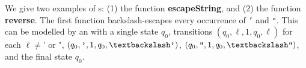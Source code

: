\begin{example}\label{exmp-ft}
    We give two examples of \FT{}s: %
    (1) the function \textbf{escapeString}, and (2) the  function \textbf{reverse}.
%
%
%
The first function backslash-escapes every occurrence of \texttt{'} and 
\texttt{"}. This can be modelled by an \FT{} with a single state $q_0$,
transitions 
$(q_0, \ell, 1, q_0, \ell)$ for each $\ell \neq  \texttt{'}$  or $\texttt{"} $, 
$(q_0,\texttt{'}, 1, q_0, \textbackslash\texttt{'})$, 
$(q_0,\texttt{"}, 1, q_0, \textbackslash\texttt{"})$,  
and the final state $q_0$.

\end{example}
